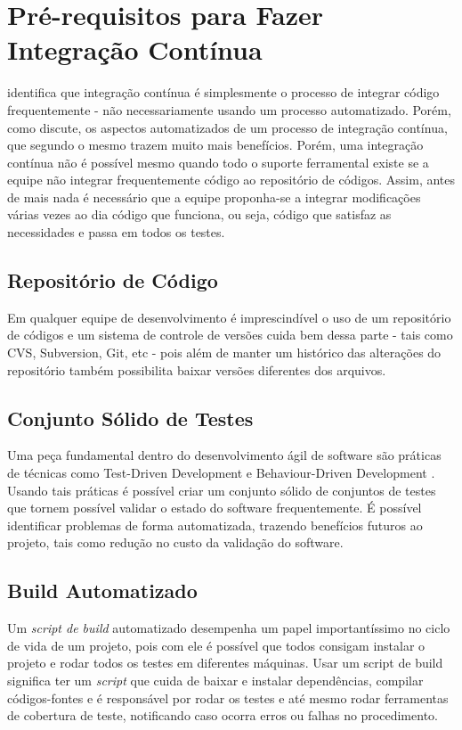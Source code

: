 \documentclass[10pt,a4paper,font=plain]{abnt}
\begin{document}
\section{Pré-requisitos para Fazer Integração Contínua}

 identifica que integração contínua é simplesmente o processo de integrar código frequentemente - não necessariamente usando um processo automatizado. Porém, como  discute, os aspectos automatizados de um processo de integração contínua, que segundo o mesmo trazem muito mais benefícios.
Porém, uma integração contínua não é possível mesmo quando todo o suporte ferramental existe se a equipe não integrar frequentemente código ao repositório de códigos. Assim, antes de mais nada é necessário que a equipe proponha-se a integrar modificações várias vezes ao dia código que funciona, ou seja, código que satisfaz as necessidades e passa em todos os testes.


\subsection{Repositório de Código}

Em qualquer equipe de desenvolvimento é imprescindível o uso de um repositório de códigos e um sistema de controle de versões cuida bem dessa parte - tais como CVS, Subversion, Git, etc - pois além de manter um histórico das alterações do repositório também possibilita baixar versões diferentes dos arquivos.

\subsection{Conjunto Sólido de Testes}

Uma peça fundamental dentro do desenvolvimento ágil de software são práticas de técnicas como Test-Driven Development \cite{TDD} e Behaviour-Driven Development \cite{BDD}. Usando tais práticas é possível criar um conjunto sólido de conjuntos de testes que tornem possível validar o estado do software frequentemente. É possível identificar problemas de forma automatizada, trazendo benefícios futuros ao projeto, tais como redução no custo da validação do software.


\subsection{Build Automatizado}

Um \textit{script de build} automatizado desempenha um papel importantíssimo no ciclo de vida de um projeto, pois com ele é possível que todos consigam instalar o projeto e rodar todos os testes em diferentes máquinas. Usar um script de build significa ter um \textit{script} que cuida de baixar e instalar dependências, compilar códigos-fontes e é responsável por rodar os testes e até mesmo rodar ferramentas de cobertura de teste, notificando caso ocorra erros ou falhas no procedimento.
\end{document}
